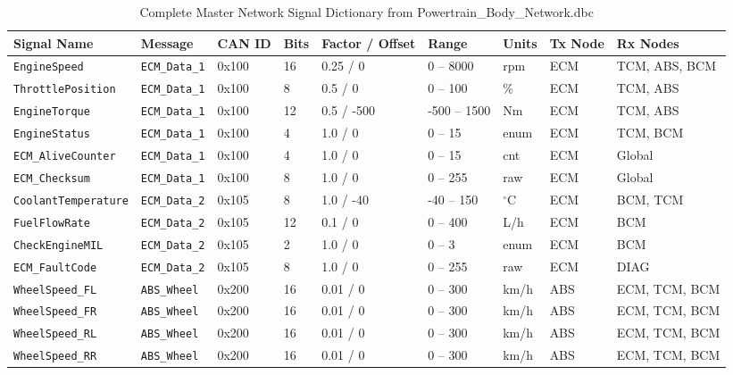 \documentclass[11pt,a4paper]{article}
\begin{document}
\begin{table}[H]
\centering
\caption{Complete Master Network Signal Dictionary from Powertrain\_Body\_Network.dbc}
\label{tab:all_signals}
\renewcommand{\arraystretch}{1.15}
\scriptsize
\begin{tabular}{p{2.6cm} p{1.6cm} p{1.2cm} p{1.0cm} p{1.8cm} p{1.6cm} p{1.0cm} p{1.4cm} p{2.2cm}}
\toprule
\textbf{Signal Name} & \textbf{Message} & \textbf{CAN ID} & \textbf{Bits} & \textbf{Factor / Offset} & \textbf{Range} & \textbf{Units} & \textbf{Tx Node} & \textbf{Rx Nodes} \\
\midrule
\texttt{EngineSpeed} & \texttt{ECM\_Data\_1} & 0x100 & 16 & 0.25 / 0 & 0 -- 8000 & rpm & ECM & TCM, ABS, BCM \\
\texttt{ThrottlePosition} & \texttt{ECM\_Data\_1} & 0x100 & 8 & 0.5 / 0 & 0 -- 100 & \% & ECM & TCM, ABS \\
\texttt{EngineTorque} & \texttt{ECM\_Data\_1} & 0x100 & 12 & 0.5 / -500 & -500 -- 1500 & Nm & ECM & TCM, ABS \\
\texttt{EngineStatus} & \texttt{ECM\_Data\_1} & 0x100 & 4 & 1.0 / 0 & 0 -- 15 & enum & ECM & TCM, BCM \\
\texttt{ECM\_AliveCounter} & \texttt{ECM\_Data\_1} & 0x100 & 4 & 1.0 / 0 & 0 -- 15 & cnt & ECM & Global \\
\texttt{ECM\_Checksum} & \texttt{ECM\_Data\_1} & 0x100 & 8 & 1.0 / 0 & 0 -- 255 & raw & ECM & Global \\
\texttt{CoolantTemperature} & \texttt{ECM\_Data\_2} & 0x105 & 8 & 1.0 / -40 & -40 -- 150 & $^\circ$C & ECM & BCM, TCM \\
\texttt{FuelFlowRate} & \texttt{ECM\_Data\_2} & 0x105 & 12 & 0.1 / 0 & 0 -- 400 & L/h & ECM & BCM \\
\texttt{CheckEngineMIL} & \texttt{ECM\_Data\_2} & 0x105 & 2 & 1.0 / 0 & 0 -- 3 & enum & ECM & BCM \\
\texttt{ECM\_FaultCode} & \texttt{ECM\_Data\_2} & 0x105 & 8 & 1.0 / 0 & 0 -- 255 & raw & ECM & DIAG \\
\texttt{WheelSpeed\_FL} & \texttt{ABS\_Wheel} & 0x200 & 16 & 0.01 / 0 & 0 -- 300 & km/h & ABS & ECM, TCM, BCM \\
\texttt{WheelSpeed\_FR} & \texttt{ABS\_Wheel} & 0x200 & 16 & 0.01 / 0 & 0 -- 300 & km/h & ABS & ECM, TCM, BCM \\
\texttt{WheelSpeed\_RL} & \texttt{ABS\_Wheel} & 0x200 & 16 & 0.01 / 0 & 0 -- 300 & km/h & ABS & ECM, TCM, BCM \\
\texttt{WheelSpeed\_RR} & \texttt{ABS\_Wheel} & 0x200 & 16 & 0.01 / 0 & 0 -- 300 & km/h & ABS & ECM, TCM, BCM \\

\end{tabular}
\end{table}
\end{document}
